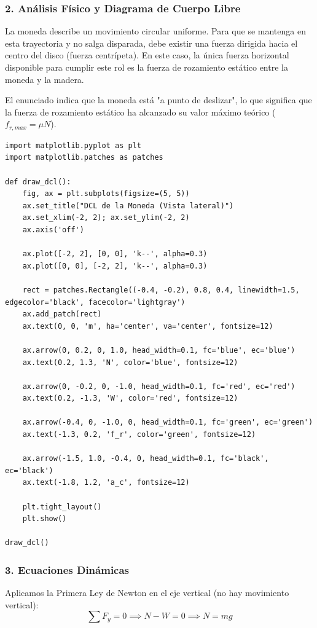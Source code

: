 \documentclass[12pt, a4paper]{article}
\begin{document}
\subsubsection*{2. Análisis Físico y Diagrama de Cuerpo Libre}
La moneda describe un movimiento circular uniforme. Para que se mantenga en esta trayectoria y no salga disparada, debe existir una fuerza dirigida hacia el centro del disco (fuerza centrípeta). En este caso, la única fuerza horizontal disponible para cumplir este rol es la fuerza de rozamiento estático entre la moneda y la madera.

El enunciado indica que la moneda está "a punto de deslizar", lo que significa que la fuerza de rozamiento estático ha alcanzado su valor máximo teórico ($f_{r,max} = \mu N$).

\begin{lstlisting}
import matplotlib.pyplot as plt
import matplotlib.patches as patches

def draw_dcl():
    fig, ax = plt.subplots(figsize=(5, 5))
    ax.set_title("DCL de la Moneda (Vista lateral)")
    ax.set_xlim(-2, 2); ax.set_ylim(-2, 2)
    ax.axis('off')
    
    ax.plot([-2, 2], [0, 0], 'k--', alpha=0.3)
    ax.plot([0, 0], [-2, 2], 'k--', alpha=0.3)
    
    rect = patches.Rectangle((-0.4, -0.2), 0.8, 0.4, linewidth=1.5, edgecolor='black', facecolor='lightgray')
    ax.add_patch(rect)
    ax.text(0, 0, 'm', ha='center', va='center', fontsize=12)
    
    ax.arrow(0, 0.2, 0, 1.0, head_width=0.1, fc='blue', ec='blue')
    ax.text(0.2, 1.3, 'N', color='blue', fontsize=12)
    
    ax.arrow(0, -0.2, 0, -1.0, head_width=0.1, fc='red', ec='red')
    ax.text(0.2, -1.3, 'W', color='red', fontsize=12)
    
    ax.arrow(-0.4, 0, -1.0, 0, head_width=0.1, fc='green', ec='green')
    ax.text(-1.3, 0.2, 'f_r', color='green', fontsize=12)
    
    ax.arrow(-1.5, 1.0, -0.4, 0, head_width=0.1, fc='black', ec='black')
    ax.text(-1.8, 1.2, 'a_c', fontsize=12)

    plt.tight_layout()
    plt.show()

draw_dcl()
\end{lstlisting}

\subsubsection*{3. Ecuaciones Dinámicas}
Aplicamos la Primera Ley de Newton en el eje vertical (no hay movimiento vertical):
$$ \sum F_y = 0 \implies N - W = 0 \implies N = mg $$
\end{document}
